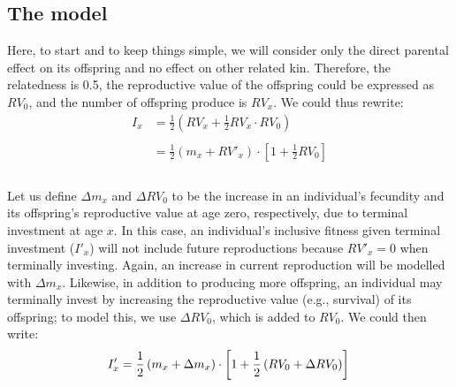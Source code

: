 \documentclass[12pt,review,authoryear]{elsarticle}
\begin{document}
\subsection{The model}
Here, to start and to keep things simple, we will  consider only the direct parental effect on its offspring and no effect on other related kin. Therefore, the relatedness is 0.5, the reproductive value of the offspring could be expressed as $RV_0$, and the number of offspring produce is $RV_x$. We could thus rewrite:
\begin{equation}\label{eq:Ix}
	\begin{split}
		I_x& = \frac{1}{2} \left(RV_x + \frac{1}{2} RV_x \cdot RV_0 \right) \\ \\ 
		& = \frac{1}{2} \left( m_x + RV'_{x} \right) \cdot \left[1 + \frac{1}{2} RV_0 \right] \\ \\
	\end{split}
\end{equation}

Let us define $\Delta m_{x}$ and $\Delta RV_{0}$ to be the increase in an individual's fecundity and its offspring's reproductive value at age zero, respectively, due to terminal investment at age $x$. In this case, an individual's inclusive fitness given terminal investment ($I'_{x}$) will not include future reproductions because $RV'_{x}=0$ when terminally investing. Again, an increase in current reproduction will be modelled with $\Delta m_{x}$. Likewise, in addition to producing more offspring, an individual may terminally invest by increasing the reproductive value (e.g., survival) of its offspring; to model this, we use $\Delta RV_{0}$, which is added to $RV_{0}$.  We could then write:
\begin{equation}\label{eq:Iti}
	I'_{x} = \frac{1}{2} \left( m_x + \Delta m_{x} \right) \cdot \left[1 + \frac{1}{2} \left( RV_0 + \Delta RV_0 \right) \right] \\ \\
\end{equation} 
\end{document}
